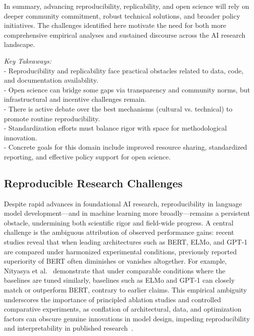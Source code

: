 \documentclass[sigconf]{acmart}
\begin{document}
In summary, advancing reproducibility, replicability, and open science will rely on deeper community commitment, robust technical solutions, and broader policy initiatives. The challenges identified here motivate the need for both more comprehensive empirical analyses and sustained discourse across the AI research landscape.

\begin{flushright}
\textit{Key Takeaways:} \\
- Reproducibility and replicability face practical obstacles related to data, code, and documentation availability. \\
- Open science can bridge some gaps via transparency and community norms, but infrastructural and incentive challenges remain. \\
- There is active debate over the best mechanisms (cultural vs. technical) to promote routine reproducibility. \\
- Standardization efforts must balance rigor with space for methodological innovation. \\
- Concrete goals for this domain include improved resource sharing, standardized reporting, and effective policy support for open science.
\end{flushright}

\subsection{Reproducible Research Challenges}

Despite rapid advances in foundational AI research, reproducibility in language model development—and in machine learning more broadly—remains a persistent obstacle, undermining both scientific rigor and field-wide progress. A central challenge is the ambiguous attribution of observed performance gains: recent studies reveal that when leading architectures such as BERT, ELMo, and GPT-1 are compared under harmonized experimental conditions, previously reported superiority of BERT often diminishes or vanishes altogether. For example, Nityasya et al.~\cite{ref107} demonstrate that under comparable conditions where the baselines are tuned similarly, baselines such as ELMo and GPT-1 can closely match or outperform BERT, contrary to earlier claims. This empirical ambiguity underscores the importance of principled ablation studies and controlled comparative experiments, as conflation of architectural, data, and optimization factors can obscure genuine innovations in model design, impeding reproducibility and interpretability in published research~\cite{ref107}.
\end{document}

